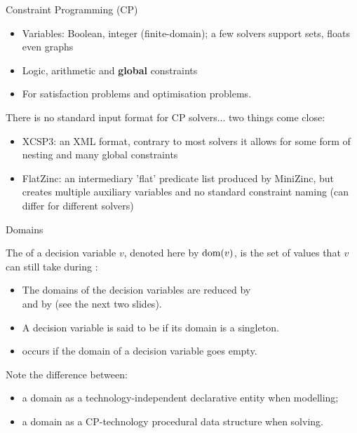 \documentclass{cons-beamer}
\begin{document}
\begin{frame}{Constraint Programming (CP)}
  \begin{itemize}
    \item Variables: Boolean, integer (finite-domain); a few solvers support sets, floats even graphs
    \item Logic, arithmetic and \textbf{global} constraints
    \item For satisfaction problems and optimisation problems.
  \end{itemize}
  \vfill

  There is no standard input format for CP solvers... two things come close:
  \begin{itemize}
    \item XCSP3: an XML format, contrary to most solvers it allows for some form of nesting and many global constraints
    \item FlatZinc: an intermediary 'flat' predicate list produced by MiniZinc, but creates multiple auxiliary variables and no standard constraint naming (can differ for different solvers) 
  \end{itemize}
\end{frame}

\begin{frame}{Domains}
  \begin{definition}
    The  of a decision variable $v$, denoted here by
    $\textnormal{dom}(v)$, is the set of values that $v$ can still take during
    :
    \begin{itemize}
      \item The domains of the decision variables are reduced by
         \\ and by  (see the next two
        slides).
      \item A decision variable is said to be  if its
        domain is a singleton.
      \item {} occurs if the domain of a
        decision variable goes empty.
    \end{itemize}
  \end{definition}
  \vfill

  Note the difference between:
  \begin{itemize}
    \item a domain as a technology-independent declarative entity when
      modelling;
    \item a domain as a CP-technology procedural data structure when
      solving.
  \end{itemize}
\end{frame}
\end{document}
